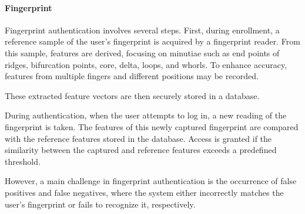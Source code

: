 \paragraph*{Fingerprint}
Fingerprint authentication involves several steps. First, during enrollment, a reference sample of the user's fingerprint is acquired by a fingerprint reader. 
From this sample, features are derived, focusing on minutiae such as end points of ridges, bifurcation points, core, delta, loops, and whorls. 
To enhance accuracy, features from multiple fingers and different positions may be recorded.

These extracted feature vectors are then securely stored in a database.

During authentication, when the user attempts to log in, a new reading of the fingerprint is taken. 
The features of this newly captured fingerprint are compared with the reference features stored in the database. 
Access is granted if the similarity between the captured and reference features exceeds a predefined threshold.

However, a main challenge in fingerprint authentication is the occurrence of false positives and false negatives, where the system either incorrectly matches the user's fingerprint or fails to recognize it, respectively.